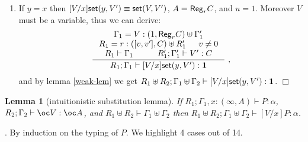 \documentclass[11pt]{article}
\newtheorem{lemma}[theorem]{Lemma}
\newcommand{\Proof}{\noindent {\sc Proof}. }
\newcommand{\qed}{\hfill${\Box}$}
\newcommand{\st}[2]{{\sf set}(#1,#2)}
\newcommand{\regtype}[2]{{\sf Reg}_{#1} #2}
\newcommand{\upair}[2]{[#1,#2]}
\begin{document}
\begin{description}
\begin{enumerate}
\item    If $y = x$ then $[V/x]\st{y}{V'} \equiv \st{V}{V'}$,
    $A=\regtype{r}C$, and $u=1$. Moreover $V$ must be a variable, 
thus we can derive:
    $$
    \inference
    {\Gamma_1=V:(1,\regtype{r}C)\uplus\Gamma'_1\\
      R_1=r:(\upair{v}{v'},C)\uplus R'_1 & v \neq 0\\
      R_1\vdash\Gamma_1 & R'_1;\Gamma'_1\vdash V':C}
    {R_1;\Gamma_1 \vdash [V/x]\st{y}{V'}:\tertype} ~,
    $$
    and by lemma \ref{weak-lem} we get $R_1\uplus R_2;\Gamma_1\uplus\Gamma_2 \vdash [V/x]\st{y}{V'}:\tertype$. \qed

\end{enumerate}
  \end{description}




\begin{lemma}[intuitionistic substitution lemma]
\label{int-sub-lem}
  If $R_1;\Gamma_1,x:(\infty,A) \vdash P:\alpha$, 
     $R_2;\Gamma_2 \vdash \oc V:\oc A$, and 
     $R_1 \uplus R_2 \vdash \Gamma_1 \uplus \Gamma_2$ 
  then $R_1 \uplus R_2;\Gamma_1 \uplus \Gamma_2 \vdash [V/x]P : \alpha$.
\end{lemma}
\Proof
  By induction on the typing of $P$. We highlight 4 cases out of 14.
\end{document}
